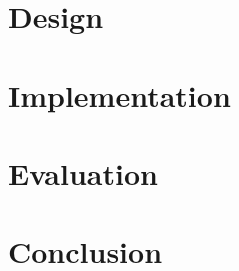 \documentclass{l4proj}
\begin{document}
\chapter{Design}


\chapter{Implementation}


\chapter{Evaluation} 

\chapter{Conclusion}    


%
% 
\end{document}
